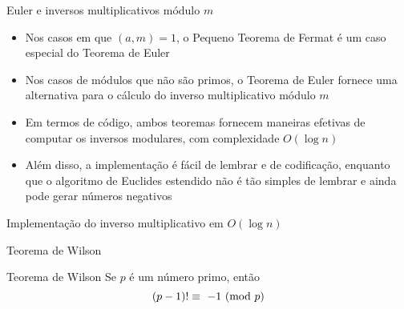 \begin{frame}[fragile]{Euler e inversos multiplicativos módulo $m$}

    \begin{itemize}
        \item Nos casos em que $(a, m) = 1$, o Pequeno Teorema de Fermat é um caso especial
            do Teorema de Euler

        \item Nos casos de módulos que não são primos, o Teorema de Euler fornece uma alternativa
            para o cálculo do inverso multiplicativo módulo $m$

        \item Em termos de código, ambos teoremas fornecem maneiras efetivas de computar os 
            inversos modulares, com complexidade $O(\log n)$

        \item Além disso, a implementação é fácil de lembrar e de codificação, enquanto que 
            o algoritmo de Euclides estendido não é tão simples de lembrar e ainda pode gerar
            números negativos
    \end{itemize}

\end{frame}

\begin{frame}[fragile]{Implementação do inverso multiplicativo em $O(\log n)$}
\end{frame}

\begin{frame}[fragile]{Teorema de Wilson}

    \begin{block}{Teorema de Wilson}
        Se $p$ é um número primo, então
        $$
            (p - 1)!\equiv\ \Mod{-1}{p}
        $$
    \end{block}

\end{frame}

